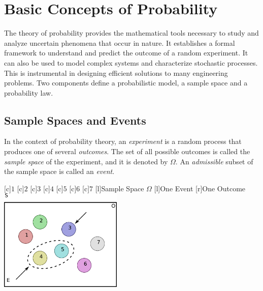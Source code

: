 \chapter[Basic Concepts]{Basic Concepts of Probability}

The theory of probability provides the mathematical tools necessary to study and analyze uncertain phenomena that occur in nature.
It establishes a formal framework to understand and predict the outcome of a random experiment.
It can also be used to model complex systems and characterize stochastic processes.
This is instrumental in designing efficient solutions to many engineering problems.
Two components define a probabilistic model, a sample space and a probability law.


\section{Sample Spaces and Events}

In the context of probability theory, an \emph{experiment} is a random process that produces one of several \emph{outcomes}.  
The set of all possible outcomes is called the \emph{sample space} of the experiment, and it is denoted by $\Omega$. 
An \emph{admissible} subset of the sample space is called an \emph{event}. 

\begin{center}  %
\begin{psfrags}
[c]{$1$}
[c]{$2$}
[c]{$3$}
[c]{$4$}
[c]{$5$}
[c]{$6$}
[c]{$7$}
[l]{Sample Space $\Omega$}
[l]{One Event}
[r]{One Outcome}
\includegraphics[height=4.85cm]{Figures/2Chapter/samplespace}
\end{psfrags}
\end{center}

